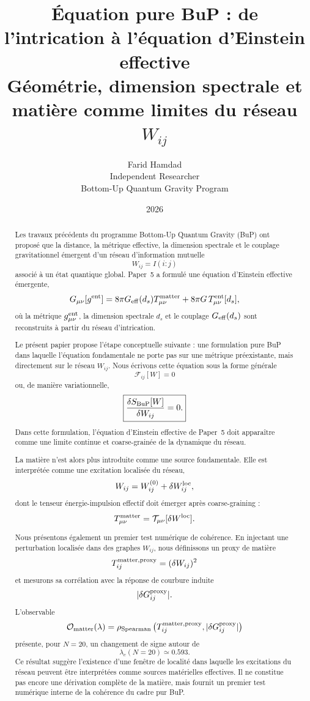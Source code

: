 \documentclass[11pt,a4paper]{article}
\title{
\textbf{Équation pure BuP : de l'intrication à l'équation d'Einstein effective}\\[0.5em]
\large Géométrie, dimension spectrale et matière comme limites du réseau \(W_{ij}\)
}
\author{
Farid Hamdad\\
\small Independent Researcher\\
\small Bottom-Up Quantum Gravity Program
}
\date{2026}
\begin{document}
\maketitle

\begin{abstract}

Les travaux précédents du programme Bottom-Up Quantum Gravity (BuP) ont proposé que la distance, la métrique effective, la dimension spectrale et le couplage gravitationnel émergent d'un réseau d'information mutuelle
\[
W_{ij}=I(i:j)
\]
associé à un état quantique global. Paper~5 a formulé une équation d'Einstein effective émergente,
\[
G_{\mu\nu}[g^{\rm ent}]
=
8\pi G_{\rm eff}(d_s)T_{\mu\nu}^{\rm matter}
+
8\pi G\,T_{\mu\nu}^{\rm ent}[d_s],
\]
où la métrique \(g_{\mu\nu}^{\rm ent}\), la dimension spectrale \(d_s\) et le couplage \(G_{\rm eff}(d_s)\) sont reconstruits à partir du réseau d'intrication.

Le présent papier propose l'étape conceptuelle suivante : une formulation pure BuP dans laquelle l'équation fondamentale ne porte pas sur une métrique préexistante, mais directement sur le réseau \(W_{ij}\). Nous écrivons cette équation sous la forme générale
\[
\boxed{
\mathcal{F}_{ij}[W]=0
}
\]
ou, de manière variationnelle,
\[
\boxed{
\frac{\delta S_{\rm BuP}[W]}{\delta W_{ij}}=0.
}
\]
Dans cette formulation, l'équation d'Einstein effective de Paper~5 doit apparaître comme une limite continue et coarse-grainée de la dynamique du réseau.

La matière n'est alors plus introduite comme une source fondamentale. Elle est interprétée comme une excitation localisée du réseau,
\[
W_{ij}=W_{ij}^{(0)}+\delta W_{ij}^{\rm loc},
\]
dont le tenseur énergie-impulsion effectif doit émerger après coarse-graining :
\[
T_{\mu\nu}^{\rm matter}
=
\mathcal{T}_{\mu\nu}[\delta W^{\rm loc}].
\]

Nous présentons également un premier test numérique de cohérence. En injectant une perturbation localisée dans des graphes \(W_{ij}\), nous définissons un proxy de matière
\[
T_{ij}^{\rm matter,proxy}=(\delta W_{ij})^2
\]
et mesurons sa corrélation avec la réponse de courbure induite
\[
|\delta G_{ij}^{\rm proxy}|.
\]
L'observable
\[
\mathcal{O}_{\rm matter}(\lambda)
=
\rho_{\rm Spearman}
\left(
T_{ij}^{\rm matter,proxy},
|\delta G_{ij}^{\rm proxy}|
\right)
\]
présente, pour \(N=20\), un changement de signe autour de
\[
\lambda_c(N=20)\simeq0.593.
\]
Ce résultat suggère l'existence d'une fenêtre de localité dans laquelle les excitations du réseau peuvent être interprétées comme sources matérielles effectives. Il ne constitue pas encore une dérivation complète de la matière, mais fournit un premier test numérique interne de la cohérence du cadre pur BuP.

\end{abstract}
\end{document}
